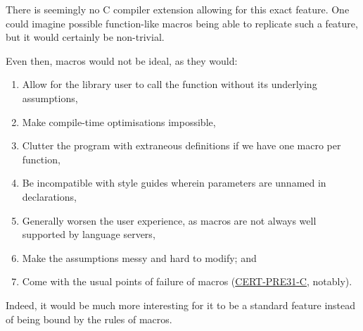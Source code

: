 \documentclass[a4paper, 12pt]{article}
\begin{document}
There is seemingly no C compiler extension allowing for this exact feature.  One
could imagine possible function-like macros being able to replicate such a
feature, but it would certainly be non-trivial.

Even then, macros would not be ideal, as they would:
\begin{enumerate}
\item Allow for the library user to call the function without its underlying assumptions,
\item Make compile-time optimisations impossible,
\item Clutter the program with extraneous definitions if we have one macro per function,
\item Be incompatible with style guides wherein parameters are unnamed in declarations,
\item Generally worsen the user experience, as macros are not always well supported
by language servers,
\item Make the assumptions messy and hard to modify; and
\item Come with the usual points of failure of macros (\href{https://wiki.sei.cmu.edu/confluence/display/c/PRE31-C.+Avoid+side+effects+in+arguments+to+unsafe+macros}{CERT-PRE31-C}, notably).
\end{enumerate}

Indeed, it would be much more interesting for it to be a standard feature
instead of being bound by the rules of macros.
\end{document}
